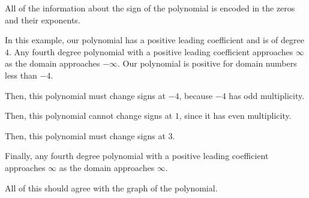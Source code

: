 \documentclass{ximera}
\begin{document}
\begin{example}
\begin{image}
  \end{image}




All of the information about the sign of the polynomial is encoded in the zeros and their exponents. 


In this example, our polynomial has a positive leading coefficient and is of degree $4$. Any fourth degree polynomial with a positive leading coefficient approaches $\infty$ as the domain approaches $-\infty$.  Our polynomial is positive for domain numbers less than $-4$.


Then, this polynomial must change signs at $-4$, because $-4$ has odd multiplicity.  

Then, this polynomial cannot change signs at $1$, since it has even multiplicity.  

Then, this polynomial must change signs at $3$.  

Finally, any fourth degree polynomial with a positive leading coefficient approaches $\infty$ as the domain approaches $\infty$.
 


\end{example}

All of this should agree with the graph of the polynomial. 
\end{document}
